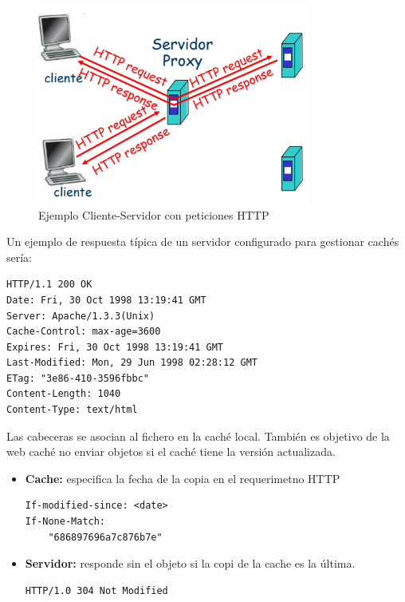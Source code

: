 \documentclass[a4paper,11pt]{article}
\begin{document}
\begin{figure}[h]
\centering
\includegraphics[scale=1,width=0.8\textwidth]{web_cache.png}
\caption{Ejemplo Cliente-Servidor con peticiones HTTP}
\end{figure}

Un ejemplo de respuesta típica de un servidor configurado para gestionar cachés sería:

\begin{verbatim}
HTTP/1.1 200 OK
Date: Fri, 30 Oct 1998 13:19:41 GMT
Server: Apache/1.3.3(Unix)
Cache-Control: max-age=3600
Expires: Fri, 30 Oct 1998 13:19:41 GMT
Last-Modified: Mon, 29 Jun 1998 02:28:12 GMT
ETag: "3e86-410-3596fbbc"
Content-Length: 1040
Content-Type: text/html
\end{verbatim}

Las cabeceras se asocian al fichero en la caché local. También es objetivo de la web caché no enviar objetos si el caché tiene la versión actualizada.

\begin{itemize}
\item \textbf{Cache:} especifica la fecha de la copia en el requerimetno HTTP

\begin{verbatim}
If-modified-since: <date>
If-None-Match:
	"686897696a7c876b7e"
\end{verbatim}

\item \textbf{Servidor:} responde sin el objeto si la copi de la cache es la última.

\begin{verbatim}
HTTP/1.0 304 Not Modified

\end{verbatim}
\end{itemize}
\end{document}
